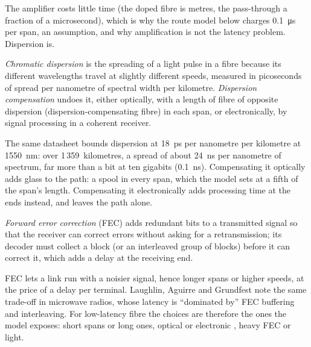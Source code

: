 The amplifier costs little time (the doped fibre is metres, the pass-through a fraction of a microsecond), which is why the route model below
charges \qty{0.1}{\micro\second} per span, an assumption, and why amplification is not the latency problem. Dispersion is.

\begin{definition}\label{def:nw:long-haul-fibre:disp}
\emph{Chromatic dispersion} is the spreading of a light pulse in a fibre because its different wavelengths travel
at slightly different speeds, measured in picoseconds of spread per nanometre of spectral width per kilometre. \emph{Dispersion
compensation} undoes it, either optically, with a length of fibre of opposite dispersion (dispersion-compensating
fibre) in each span, or electronically, by signal processing in a coherent receiver.
\end{definition}

The same datasheet bounds dispersion at \qty{18}{\pico\second} per nanometre per kilometre at \qty{1550}{\nano\metre}: over 1\,359~kilometres, a
spread of about \qty{24}{\nano\second} per nanometre of spectrum, far more than a bit at ten gigabits (\qty{0.1}{\nano\second}). Compensating it
optically adds glass to the path: a spool in every span, which the model sets at a fifth of the span's length. Compensating it electronically
adds processing time at the ends instead, and leaves the path alone.

\begin{definition}\label{def:nw:long-haul-fibre:fec}
\emph{Forward error correction} (FEC) adds redundant bits to a transmitted signal so that the receiver can
correct errors without asking for a retransmission; its decoder must collect a block (or an interleaved group of blocks) before it can correct
it, which adds a delay at the receiving end.
\end{definition}

FEC lets a link run with a noisier signal, hence longer spans or higher speeds, at the price of a delay per terminal. Laughlin, Aguirre and
Grundfest note the same trade-off in microwave radios, whose latency is ``dominated by'' FEC buffering and interleaving. For low-latency
fibre the choices are therefore the ones the model exposes: short spans or long ones, optical or electronic , heavy
FEC or light.

